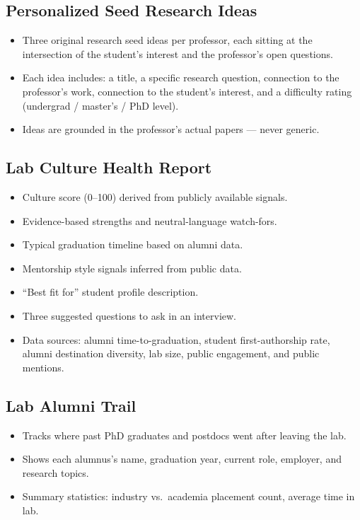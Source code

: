 \documentclass{article}
\begin{document}
\subsection{Personalized Seed Research Ideas}
\begin{itemize}
  \item Three original research seed ideas per professor, each sitting at the
        intersection of the student's interest and the professor's open questions.
  \item Each idea includes: a title, a specific research question, connection to the
        professor's work, connection to the student's interest, and a difficulty
        rating (undergrad / master's / PhD level).
  \item Ideas are grounded in the professor's actual papers — never generic.
\end{itemize}

\subsection{Lab Culture Health Report}
\begin{itemize}
  \item Culture score (0--100) derived from publicly available signals.
  \item Evidence-based strengths and neutral-language watch-fors.
  \item Typical graduation timeline based on alumni data.
  \item Mentorship style signals inferred from public data.
  \item ``Best fit for'' student profile description.
  \item Three suggested questions to ask in an interview.
  \item Data sources: alumni time-to-graduation, student first-authorship rate,
        alumni destination diversity, lab size, public engagement, and public mentions.
\end{itemize}

\subsection{Lab Alumni Trail}
\begin{itemize}
  \item Tracks where past PhD graduates and postdocs went after leaving the lab.
  \item Shows each alumnus's name, graduation year, current role, employer,
        and research topics.
  \item Summary statistics: industry vs.\ academia placement count, average
        time in lab.
\end{itemize}
\end{document}
